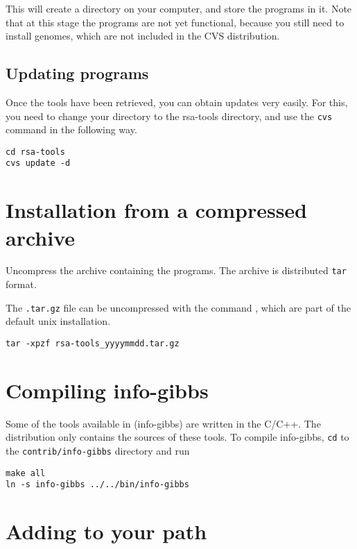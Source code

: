 \documentclass{book}
\begin{document}
This will create a directory  on your computer, and
store the programs in it. Note that at this stage the programs are not
yet functional, because you still need to install genomes, which are
not included in the CVS distribution.

\subsection{Updating \RSAT programs}

Once the tools have been retrieved, you can obtain updates very
easily. For this, you need to change your directory to the rsa-tools
directory, and use the \texttt{cvs} command in the following way.

\begin{verbatim}
cd rsa-tools
cvs update -d
\end{verbatim}


\section{Installation from a compressed archive}

Uncompress the archive containing the programs. The archive is
distributed \texttt{tar} format.

The \texttt{.tar.gz} file can be uncompressed with the command
, which are part of the default unix installation.

\begin{verbatim}
tar -xpzf rsa-tools_yyyymmdd.tar.gz
\end{verbatim}

\section{Compiling info-gibbs}
Some of the tools available in \RSAT (info-gibbs) are written in the C/C++. The distribution only contains the sources of these tools.
To compile info-gibbs, \verb|cd| to the \verb|contrib/info-gibbs| directory and run
\begin{verbatim}
make all
ln -s info-gibbs ../../bin/info-gibbs
\end{verbatim}


\section{Adding \RSAT to your path}
\end{document}
